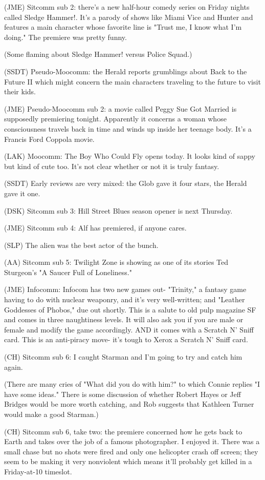 \documentclass[12pt]{article}
\begin{document}
(JME) Sitcomm sub 2: there's a new half-hour comedy series on Friday nights called Sledge Hammer!. It's a parody of shows like Miami Vice and Hunter and features a main character whose favorite line is "Trust me, I know what I'm doing." The premiere was pretty funny.

(Some flaming about Sledge Hammer! versus Police Squad.)

(SSDT) Pseudo-Moocomm: the Herald reports grumblings about Back to the Future II which might concern the main characters traveling to the future to visit their kids.

(JME) Pseudo-Moocomm sub 2: a movie called Peggy Sue Got Married is supposedly premiering tonight. Apparently it concerns a woman whose consciousness travels back in time and winds up inside her teenage body. It's a Francis Ford Coppola movie.

(LAK) Moocomm: The Boy Who Could Fly opens today. It looks kind of sappy but kind of cute too. It's not clear whether or not it is truly fantasy.

(SSDT) Early reviews are very mixed: the Glob gave it four stars, the Herald gave it one.

(DSK) Sitcomm sub 3: Hill Street Blues season opener is next Thursday.

(JME) Sitcomm sub 4: Alf has premiered, if anyone cares.

(SLP) The alien was the best actor of the bunch.

(AA) Sitcomm sub 5: Twilight Zone is showing as one of its stories Ted Sturgeon's "A Saucer Full of Loneliness."

(JME) Infocomm: Infocom has two new games out- "Trinity," a fantasy game having to do with nuclear weaponry, and it's very well-written; and "Leather Goddesses of Phobos," due out shortly. This is a salute to old pulp magazine SF and comes in three naughtiness levels. It will also ask you if you are male or female and modify the game accordingly. AND it comes with a Scratch N' Sniff card. This is an anti-piracy move- it's tough to Xerox a Scratch N' Sniff card.

(CH) Sitcomm sub 6: I caught Starman and I'm going to try and catch him again.

(There are many cries of "What did you do with him?" to which Connie replies "I have some ideas." There is some discussion of whether Robert Hayes or Jeff Bridges would be more worth catching, and Rob suggests that Kathleen Turner would make a good Starman.)

(CH) Sitcomm sub 6, take two: the premiere concerned how he gets back to Earth and takes over the job of a famous photographer. I enjoyed it. There was a small chase but no shots were fired and only one helicopter crash off screen; they seem to be making it very nonviolent which means it'll probably get killed in a Friday-at-10 timeslot.
\end{document}
